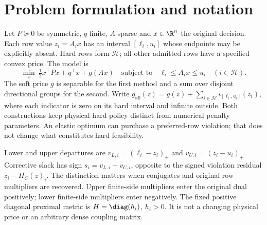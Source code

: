 \section{Problem formulation and notation}\label{sec:problem}
Let $P\succeq0$ be symmetric, $q$ finite, $A$ sparse and $x\in\R^n$ the
original decision. Each row value $z_i=A_i x$ has an interval
$[\ell_i,u_i]$ whose endpoints may be explicitly absent. Hard rows form
$\mathcal H$; all other admitted rows have a specified convex price. The
model is
\begin{equation}\label{eq:paper-model}
 \min_x\ \tfrac12x^\top P x+q^\top x+g(Ax)
 \quad\text{subject to}\quad
 \ell_i\leq A_ix\leq u_i\quad(i\in\mathcal H).
\end{equation}
The soft price $g$ is separable for the first method and a sum over disjoint
directional groups for the second. Write
$g_{\mathrm{all}}(z)=g(z)+\sum_{i\in\mathcal H}\iota_{[\ell_i,u_i]}(z_i)$,
where each indicator is zero on its hard interval and infinite outside.
Both constructions keep physical hard
policy distinct from numerical penalty parameters. An elastic optimum can
purchase a preferred-row violation; that does not change what constitutes
hard feasibility.

Lower and upper departures are $v_{L,i}=(\ell_i-z_i)_+$ and
$v_{U,i}=(z_i-u_i)_+$. Corrective slack has sign
$s_i=v_{L,i}-v_{U,i}$, opposite to the signed violation residual
$z_i-\Pi_C(z)_i$. The distinction matters when conjugates and original
row multipliers are recovered. Upper finite-side multipliers enter the
original dual positively; lower finite-side multipliers enter negatively.
The fixed positive diagonal proximal metric is $H=\diag(h_i)$, $h_i>0$.
It is not a changing physical price or an arbitrary dense coupling matrix.


